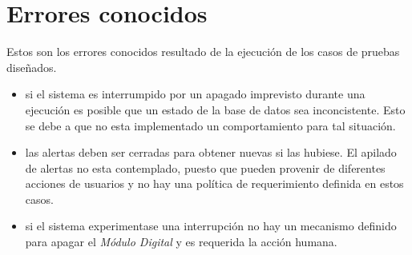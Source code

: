 \section{Errores conocidos}

Estos son los errores conocidos resultado de la ejecuci\'on de los casos de pruebas dise\~nados.


\begin{itemize}
    \item si el sistema es interrumpido por un apagado imprevisto durante una ejecuci\'on 
    es posible que un estado de la base de datos sea inconcistente. 
    Esto se debe a que no esta implementado un comportamiento para tal situaci\'on.
    
    \item las alertas deben ser cerradas para obtener nuevas si las hubiese. El apilado
    de alertas no esta contemplado, puesto que pueden provenir de diferentes acciones
    de usuarios y no hay una pol\'itica de requerimiento definida en estos casos.

    \item si el sistema experimentase una interrupci\'on no hay un mecanismo definido 
    para apagar el \textit{M\'odulo Digital} y es requerida la acci\'on humana.

\end{itemize}